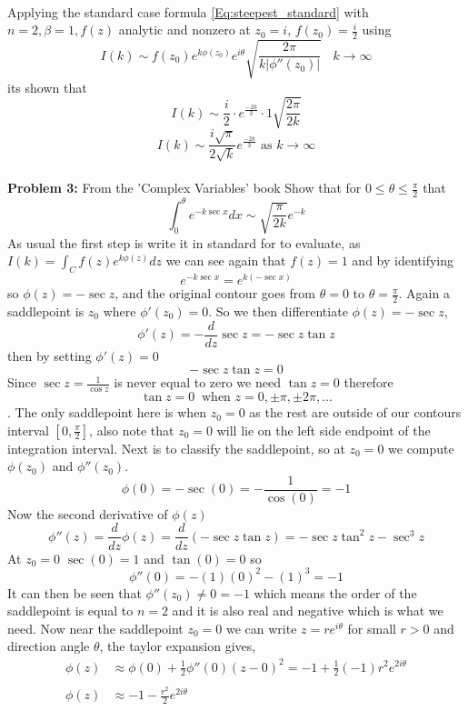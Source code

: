 \\
Applying the standard case formula \ref{Eq:steepest_standard} with $n=2, \beta=1, f(z)$ analytic and nonzero at $z_0=i$, $f(z_0)=\frac{i}{2}$ using
\begin{equation}
    I(k)\sim f(z_0)e^{k\phi(z_0)}e^{i\theta}\sqrt{\frac{2\pi}{k|\phi''(z_0)|}} \ \ \ \ k\to\infty
\end{equation} 
its shown that 
\begin{equation}
    I(k)\sim \frac{i}{2}\cdot e^{\frac{-2k}{3}}\cdot1\sqrt{\frac{2\pi}{2k}}
\end{equation}
\begin{equation}
    I(k)\sim \frac{i\sqrt{\pi}}{2\sqrt{k}}e^{\frac{-2k}{3}} \text{ as } k\to\infty
\end{equation}
\\
\textbf{Problem 3:} From the 'Complex Variables' book \cite{RedBook} Show that for $0\leq\theta\leq\frac{\pi}{2}$ that $$\int^{\theta}_{0} e^{-k\sec x} dx \sim \sqrt{\frac{\pi}{2k}}e^{-k}$$ 
As usual the first step is write it in standard for to evaluate, as $I(k)=\int_C f(z)e^{k\phi(z)}dz$ we can see again that $f(z)=1$ and by identifying $$e^{-k\sec x}=e^{k(-\sec x)}$$ so $\phi(z)=-\sec z$, and the original contour goes from $\theta=0$ to $\theta=\frac{\pi}{2}$. 
Again a saddlepoint is $z_0$ where $\phi'(z_0)=0$. So we then differentiate $\phi(z)=-\sec z$, $$\phi'(z)=-\frac{d}{dz}\sec z=-\sec z \tan z$$ then by setting $\phi'(z)=0$ $$-\sec z \tan z=0$$ Since $\sec z=\frac{1}{\cos z}$ is never equal to zero we need $\tan z=0$ therefore $$\tan z=0 \ \text{ when } z=0,\pm\pi,\pm2\pi,...$$. 
The only saddlepoint here is when $z_0=0$ as the rest are outside of our contours interval $[0,\frac{\pi}{2}]$, also note that $z_0=0$ will lie on the left side endpoint of the integration interval. 
Next is to classify the saddlepoint, so at $z_0=0$ we compute $\phi(z_0)$ and $\phi''(z_0)$. $$\phi(0)=-\sec(0)=-\frac{1}{\cos(0)}=-1$$ Now the second derivative of $\phi(z)$ $$\phi''(z)=\frac{d}{dz}\phi(z)=\frac{d}{dz}(-\sec z \tan z)=-\sec z \tan^2z-\sec^3z$$
At $z_0=0$ $\sec(0)=1$ and $\tan(0)=0$ so $$\phi''(0)=-(1)(0)^2-(1)^3=-1$$ It can then be seen that $\phi''(z_0)\neq0=-1$ which means the order of the saddlepoint is equal to $n=2$ and it is also real and negative which is what we need. 
Now near the saddlepoint $z_0=0$ we can write $z=re^{i\theta}$ for small $r>0$ and direction angle $\theta$, the taylor expansion gives, 
\begin{align*}
\phi(z) &\approx\phi(0)+\frac{1}{2}\phi''(0)(z-0)^2=-1+\frac{1}{2}(-1)r^2e^{2i\theta} \\
\\
\phi(z) &\approx-1-\frac{r^2}{2}e^{2i\theta}
\end{align*}

